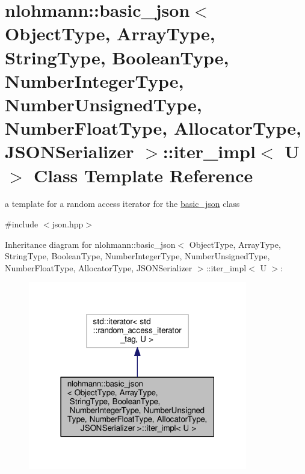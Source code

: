 \hypertarget{classnlohmann_1_1basic__json_1_1iter__impl}{}\section{nlohmann\+:\+:basic\+\_\+json$<$ Object\+Type, Array\+Type, String\+Type, Boolean\+Type, Number\+Integer\+Type, Number\+Unsigned\+Type, Number\+Float\+Type, Allocator\+Type, J\+S\+O\+N\+Serializer $>$\+:\+:iter\+\_\+impl$<$ U $>$ Class Template Reference}
\label{classnlohmann_1_1basic__json_1_1iter__impl}


a template for a random access iterator for the \hyperlink{classnlohmann_1_1basic__json}{basic\+\_\+json} class  




{\ttfamily \#include $<$json.\+hpp$>$}



Inheritance diagram for nlohmann\+:\+:basic\+\_\+json$<$ Object\+Type, Array\+Type, String\+Type, Boolean\+Type, Number\+Integer\+Type, Number\+Unsigned\+Type, Number\+Float\+Type, Allocator\+Type, J\+S\+O\+N\+Serializer $>$\+:\+:iter\+\_\+impl$<$ U $>$\+:
\nopagebreak
\begin{figure}[H]
\begin{center}
\leavevmode
\includegraphics[width=271pt]{classnlohmann_1_1basic__json_1_1iter__impl__inherit__graph}
\end{center}
\end{figure}


